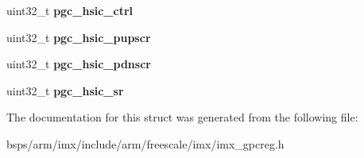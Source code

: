 \begin{DoxyCompactItemize}
\mbox{\label{structimx__gpc_a04476c6bf464d51b584bb887671df035}} 
uint32\+\_\+t {\bfseries pgc\+\_\+hsic\+\_\+ctrl}
\item 
\mbox{\label{structimx__gpc_aee5272e28e987925319bb841194d45cb}} 
uint32\+\_\+t {\bfseries pgc\+\_\+hsic\+\_\+pupscr}
\item 
\mbox{\label{structimx__gpc_a8e422abc3a7ebefc9bbc825dabe515da}} 
uint32\+\_\+t {\bfseries pgc\+\_\+hsic\+\_\+pdnscr}
\item 
\mbox{\label{structimx__gpc_a7fc3fc027ddc91073ce05e7ef76c4f51}} 
uint32\+\_\+t {\bfseries pgc\+\_\+hsic\+\_\+sr}
\end{DoxyCompactItemize}


The documentation for this struct was generated from the following file\+:\begin{DoxyCompactItemize}
\item 
bsps/arm/imx/include/arm/freescale/imx/imx\+\_\+gpcreg.\+h\end{DoxyCompactItemize}
